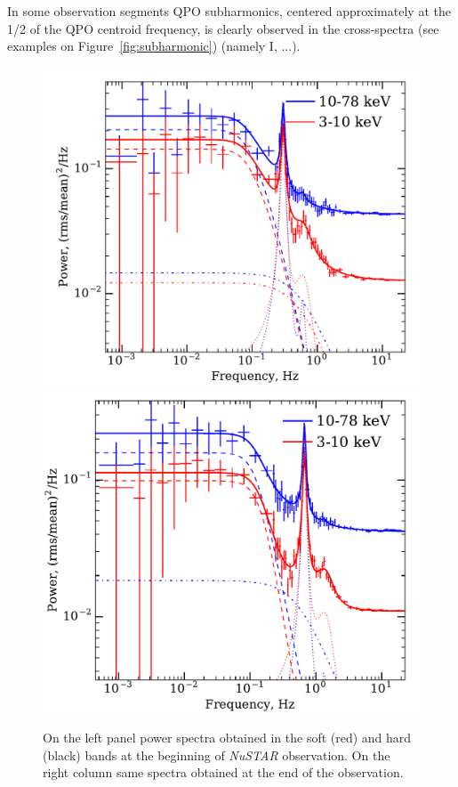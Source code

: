 \documentclass[a4paper,fleqn,usenatbib]{mnras}
\begin{document}
\begin{table}
In some observation segments QPO subharmonics, centered approximately at the 1/2 of the QPO centroid frequency, is clearly observed in the cross-spectra (see examples on Figure~\ref{fig:subharmonic}) (namely I, ...). 


\begin{figure}
        \includegraphics[trim=0 0 0 0.65cm, clip, width=\columnwidth]{NuFirst.pdf}
        \includegraphics[width=\columnwidth, height = 0.83\columnwidth]{NuLast.pdf}
        \caption{On the left panel power spectra obtained in the soft (red) and hard (black) bands at the beginning of {\it NuSTAR} observation. 
        On the right column same spectra obtained at the end of the observation.}
        \label{fig:ps_example}
\end{figure}


\end{table}
\end{document}
